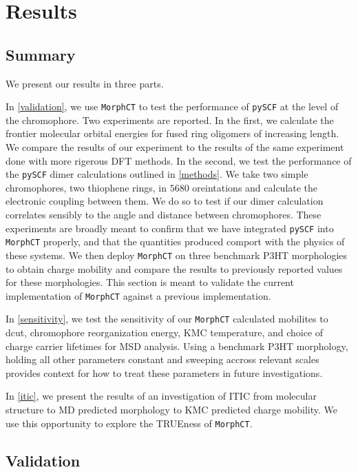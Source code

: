 \chapter{Results}
\label{results}

\section{Summary}

We present our results in three parts. 

In \autoref{validation}, we use \texttt{MorphCT} to test the performance of \texttt{pySCF} at the level of the chromophore.
Two experiments are reported. In the first, we calculate the frontier molecular orbital
energies for fused ring oligomers of increasing length. We compare the results of our experiment to the
results of the same experiment done with more rigerous DFT methods. In the second, we test the 
performance of the \texttt{pySCF} dimer calculations outlined in \autoref{methods}. 
We take two simple chromophores, two thiophene rings, in $5680$ oreintations and calculate the
electronic coupling between them. We do so to test if our dimer calculation correlates sensibly to the angle
and distance between chromophores. These experiments are broadly meant to confirm that we have integrated
\texttt{pySCF} into \texttt{MorphCT} properly, and that the quantities produced comport with the physics of these systems.
We then deploy \texttt{MorphCT} on three benchmark P3HT morphologies to obtain charge mobility
and compare the results to previously reported values for these morphologies. This section is meant to
validate the current implementation of \texttt{MorphCT} against a previous implementation. 

In \autoref{sensitivity}, we test the sensitivity of our \texttt{MorphCT} calculated mobilites to dcut, chromophore
reorganization energy, KMC temperature, and choice of charge carrier lifetimes for MSD analysis. Using a
benchmark P3HT morphology, holding all other parameters constant and sweeping accross relevant scales
provides context for how to treat these parameters in future investigations. 

In \autoref{itic}, we present the results of an investigation of ITIC from molecular structure to MD predicted
morphology to KMC predicted charge mobility. We use this opportunity to explore the TRUEness of
\texttt{MorphCT}. 

\section{Validation}

